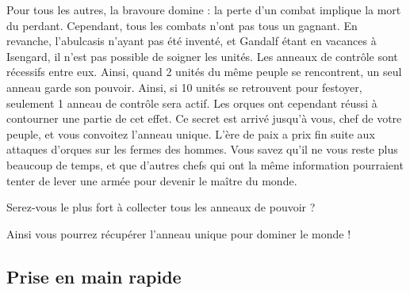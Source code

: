 \newline
Pour tous les autres, la bravoure domine : la perte d'un combat implique la mort du perdant. Cependant, tous les combats n'ont pas tous un gagnant. En revanche, l'abulcasis n'ayant pas été inventé, et Gandalf étant en vacances à Isengard, il n'est pas possible de soigner les unités.
\newline
\newline
Les anneaux de contrôle sont récessifs entre eux. Ainsi, quand 2 unités du même peuple se rencontrent, un seul anneau garde son pouvoir. Ainsi, si 10 unités se retrouvent pour festoyer, seulement 1 anneau de contrôle sera actif. Les orques ont cependant réussi à contourner une partie de cet effet.
\newpage
Ce secret est arrivé jusqu'à vous, chef de votre peuple, et vous convoitez l'anneau unique. L'ère de paix a prix fin suite aux attaques d'orques sur les fermes des hommes.  Vous savez qu'il ne vous reste plus beaucoup de temps, et que d'autres chefs qui ont la même information pourraient tenter de lever une armée pour devenir le maître du monde.
\newline
\begin{center}
Serez-vous le plus fort à collecter tous les anneaux de pouvoir ?
\end{center}
\begin{center}
Ainsi vous pourrez récupérer l'anneau unique pour dominer le monde !
\end{center}

\subsection{Prise en main rapide}

